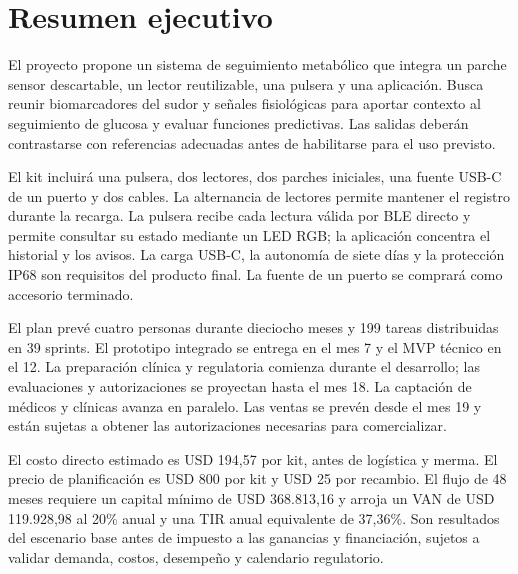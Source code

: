 \clearpage
\section{Resumen ejecutivo}
El proyecto propone un sistema de seguimiento metabólico que integra un parche sensor descartable, un lector reutilizable, una pulsera y una aplicación. Busca reunir biomarcadores del sudor y señales fisiológicas para aportar contexto al seguimiento de glucosa y evaluar funciones predictivas. Las salidas deberán contrastarse con referencias adecuadas antes de habilitarse para el uso previsto.

El kit incluirá una pulsera, dos lectores, dos parches iniciales, una fuente USB-C de un puerto y dos cables. La alternancia de lectores permite mantener el registro durante la recarga. La pulsera recibe cada lectura válida por BLE directo y permite consultar su estado mediante un LED RGB; la aplicación concentra el historial y los avisos. La carga USB-C, la autonomía de siete días y la protección IP68 son requisitos del producto final. La fuente de un puerto se comprará como accesorio terminado.

El plan prevé cuatro personas durante dieciocho meses y 199 tareas distribuidas en 39 sprints. El prototipo integrado se entrega en el mes 7 y el MVP técnico en el 12. La preparación clínica y regulatoria comienza durante el desarrollo; las evaluaciones y autorizaciones se proyectan hasta el mes 18. La captación de médicos y clínicas avanza en paralelo. Las ventas se prevén desde el mes 19 y están sujetas a obtener las autorizaciones necesarias para comercializar.

El costo directo estimado es USD 194,57 por kit, antes de logística y merma. El precio de planificación es USD 800 por kit y USD 25 por recambio. El flujo de 48 meses requiere un capital mínimo de USD 368.813,16 y arroja un VAN de USD 119.928,98 al 20\% anual y una TIR anual equivalente de 37,36\%. Son resultados del escenario base antes de impuesto a las ganancias y financiación, sujetos a validar demanda, costos, desempeño y calendario regulatorio.
